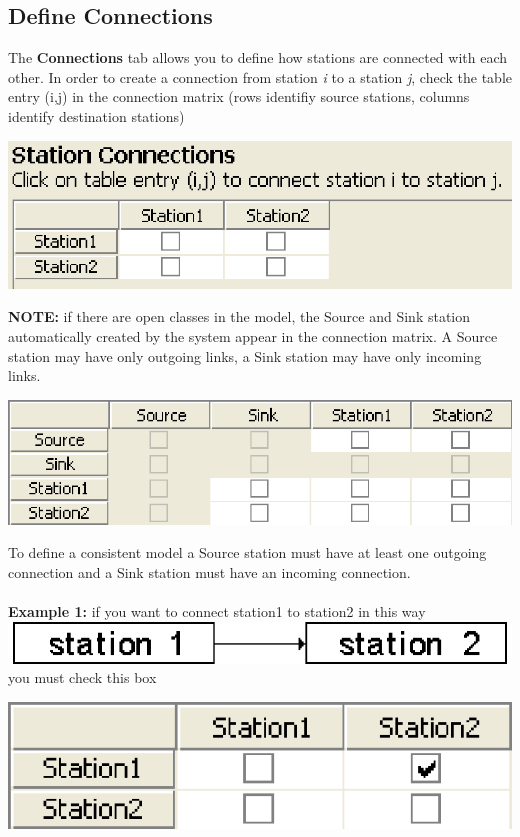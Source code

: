 \subsection{Define Connections}
\label{sec:DefineConnections}
The \textbf{Connections} tab allows you to define how stations are connected with each other.
In order to create a connection from station \emph{i} to a station \emph{j}, check the table entry (i,j) in the connection matrix (rows identifiy source stations, columns identify destination stations)
\begin{center}
\includegraphics[scale=.5]{img/jsim/connections1.eps}
\end{center}
\textbf{NOTE:} if there are open classes in the model, the Source and Sink station automatically created by the system appear in the connection matrix.  A Source station may have only outgoing links, a Sink station may have only incoming links.
\begin{center}
\includegraphics[scale=.5]{img/jsim/sink_source_connections.eps}
\end{center}
To define a consistent model a Source station must have at least one outgoing connection and a Sink station must have an incoming connection.\\\\
\textbf{Example 1:} if you want to connect station1 to station2 in this way \includegraphics[scale=.5]{img/jsim/es1.eps} you must check this box
\begin{center}
\includegraphics[scale=.5]{img/jsim/connection1.eps}
\end{center}
